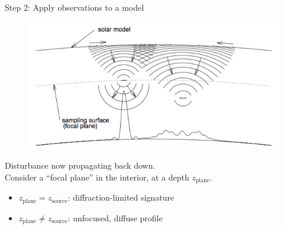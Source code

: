 \documentclass{beamer}
\begin{document}
\begin{frame}{Step 2: Apply observations to a model}
    \begin{figure}
        \includegraphics[width=\textwidth]{fig_2.png}
    \end{figure}
    Disturbance now propagating back down.\\
    Consider a ``focal plane'' in the interior, at a depth
    $z_{\textrm{plane}}$.
    \begin{itemize}
        \item $z_{\textrm{plane}} = z_{\textrm{source}}$:
            diffraction-limited signature
        \item $z_{\textrm{plane}} \neq z_{\textrm{source}}$:
            unfocused, diffuse profile
    \end{itemize}
\end{frame}
\end{document}
